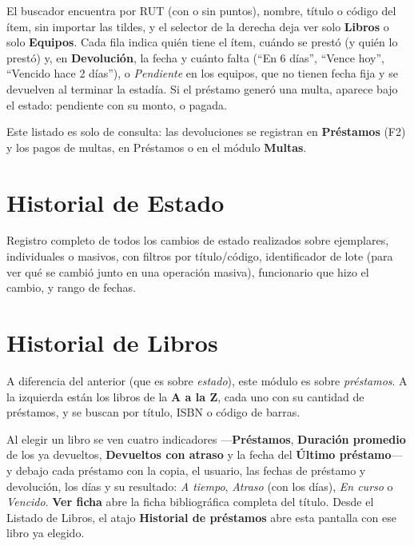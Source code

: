 \documentclass[11pt,a4paper]{report}
\begin{document}
El buscador encuentra por RUT (con o sin puntos), nombre, título o código
del ítem, sin importar las tildes, y el selector de la derecha deja ver
solo \textbf{Libros} o solo \textbf{Equipos}. Cada fila indica quién tiene
el ítem, cuándo se prestó (y quién lo prestó) y, en
\textbf{Devolución}, la fecha y cuánto falta (``En 6 días'', ``Vence
hoy'', ``Vencido hace 2 días''), o \emph{Pendiente} en los equipos, que
no tienen fecha fija y se devuelven al terminar la estadía. Si el préstamo
generó una multa, aparece bajo el
estado: pendiente con su monto, o pagada.

\begin{nota}
Este listado es solo de consulta: las devoluciones se registran en
\textbf{Préstamos} (F2) y los pagos de multas, en Préstamos o en el
módulo \textbf{Multas}.
\end{nota}

\section{Historial de Estado}


Registro completo de todos los cambios de estado realizados sobre
ejemplares, individuales o masivos, con filtros por título/código,
identificador de lote (para ver qué se cambió junto en una operación
masiva), funcionario que hizo el cambio, y rango de fechas.


\section{Historial de Libros}


A diferencia del anterior (que es sobre \emph{estado}), este módulo es
sobre \emph{préstamos}. A la izquierda están los libros de la \textbf{A a
la Z}, cada uno con su cantidad de préstamos, y se buscan por título, ISBN
o código de barras.


Al elegir un libro se ven cuatro indicadores ---\textbf{Préstamos},
\textbf{Duración promedio} de los ya devueltos, \textbf{Devueltos con
atraso} y la fecha del \textbf{Último préstamo}--- y debajo cada préstamo
con la copia, el usuario, las fechas de préstamo y devolución, los días y
su resultado: \emph{A tiempo}, \emph{Atraso} (con los días), \emph{En
curso} o \emph{Vencido}. \textbf{Ver ficha} abre la ficha bibliográfica
completa del título. Desde el Listado de Libros, el atajo
\textbf{Historial de préstamos} abre esta pantalla con ese libro ya
elegido.
\end{document}
